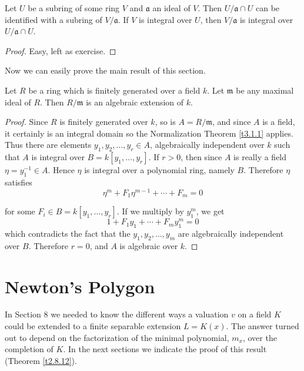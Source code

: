 \begin{lem}
\label{l3.1.2}
Let $U$ be a subring of some ring $V$ and $\mathfrak{a}$ an ideal of $V$. Then $U/\mathfrak{a}\cap U$ can be identified with a subring of $ V/\mathfrak{a}$. If $V$ is integral over $U$, then $ V/\mathfrak{a}$ is integral over $U/\mathfrak{a}\cap U$.
\end{lem}

\begin{proof}
Easy, left as exercise.
\end{proof}

Now we can easily prove the main result of this section.

\begin{theo}
\label{t3.1.2}
Let $R$ be a ring which is finitely generated over a field $k$. Let $\mathfrak{m}$ be any maximal ideal of $R$. Then $R/\mathfrak{m}$ is an algebraic extension of $k$.
\end{theo}

\begin{proof}
Since $R$ is finitely generated over $k$, so is $A=R/\mathfrak{m}$, and since $A$ is a field, it certainly is an integral domain so the Normalization Theorem \ref{t3.1.1} applies. Thus there are elements $y_{1},y_{2},\ldots,y_{r}\in A$, algebraically independent over $k$ such that $A$ is integral over $B=k[y_{1},\ldots,y_{r}]$. If $r>0$, then since $A$ is really a field $\eta=y_{1}^{-1}\in A$. Hence $\eta$ is integral over a polynomial ring, namely $B$. Therefore $\eta$ satisfies
$$
\eta^{m}+F_{1}\eta^{m-1}+\cdots+F_{m}=0
$$

for some $F_{i}\in B=k[y_{1},\ldots,y_{r}]$. If we multiply by $y_{1}^{m}$, we get
$$
1+F_{1}y_{1}+\cdots+F_{m}y_{1}^{m}=0
$$
which contradicts the fact that the $y_{1},y_{2},\ldots,y_{m}$ are algebraically independent over $B$. Therefore $r=0$, and $A$ is algebraic over $k$.
\end{proof}

\section{Newton's Polygon}

In Section 8 we needed to know the different ways a valuation $v$ on a field $K$ could be extended to a finite separable extension $L=K(x)$. The answer turned out to depend on the factorization of the minimal polynomial, $m_{x}$, over the completion of $K$. In the next sections we indicate the proof of this result (Theorem \ref{t2.8.12}).

